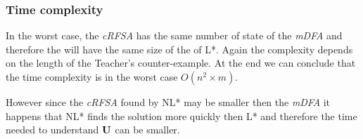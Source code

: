 \subsubsection{Time complexity}
In the worst case, the \textit{cRFSA} has the same number of state of the \textit{mDFA} and therefore the \OT will have the same size of the \OT of L*. Again the complexity depends on the length of the Teacher's counter-example. At the end we can conclude that the time complexity is in the worst case $O(n^2 \times m)$.

However since the \textit{cRFSA} found by NL* may be smaller then the \textit{mDFA} it happens that NL* finds the solution more quickly then L* and therefore the time needed to understand $\mathbf{U}$ can be smaller.